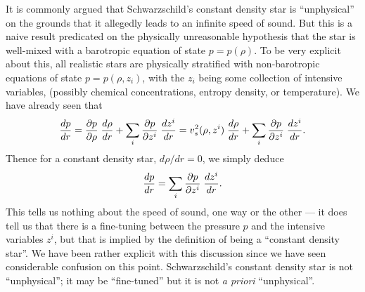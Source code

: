 \documentclass[12pt]{article}
\begin{document}
It is commonly argued that Schwarzschild's constant density star is ``unphysical'' on the grounds that it allegedly leads to an infinite speed of sound. But this is a naive result predicated on the physically unreasonable hypothesis that the star is well-mixed with a barotropic equation of state $p=p(\rho)$. To be very explicit about this, all realistic stars are physically stratified with non-barotropic equations of state $p=p(\rho, z_i)$, with the $z_i$ being some collection of intensive variables,  (possibly chemical concentrations, entropy density, or temperature). We have already seen that
\begin{equation}
{dp \over dr } = {\partial p\over\partial\rho}\; {d\rho\over dr} + 
\sum_i {\partial p\over\partial z^i} \;{d z^i\over dr}
=
v_s^2(\rho,z^i)\; {d\rho\over dr} + 
\sum_i {\partial p\over\partial z^i} \;{d z^i\over dr}. 
\end{equation}
Thence for a constant density star, $d\rho/dr=0$, we simply deduce
\begin{equation}
{dp \over dr } = 
\sum_i {\partial p\over\partial z^i} \;{d z^i\over dr}. 
\end{equation}
This tells us nothing about the speed of sound, one way or the other --- it does tell us that there is a fine-tuning between the pressure $p$ and the intensive variables $z^i$, but that is implied by  the definition of being a ``constant density star''. 
We have been rather explicit with this discussion since we have seen considerable confusion on this point. Schwarzschild's constant density star is not ``unphysical''; it may be ``fine-tuned'' but it
 is not \emph{a priori} ``unphysical''.
\end{document}
